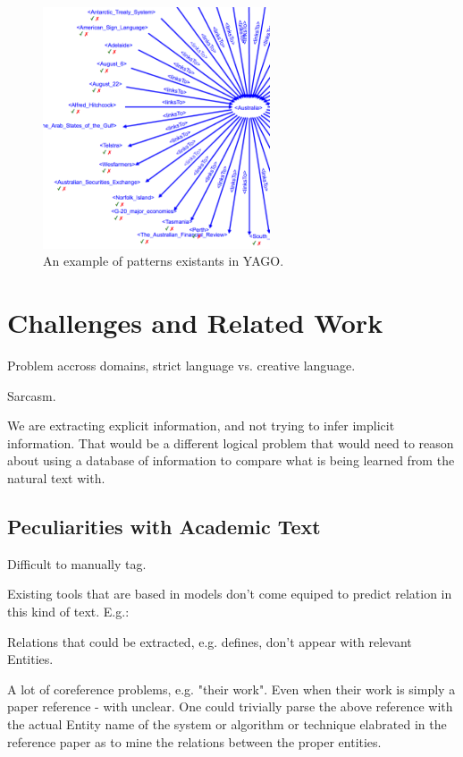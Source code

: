 \documentclass[11pt,a4paper,openright]{memoir}
\begin{document}
\begin{figure}[!htbp]
  \centering
    \includegraphics[width=0.6\textwidth]{./images/yago}
  \caption[An example of patterns existants in YAGO.]{An example of patterns existants in YAGO.}
  \label{fig:yago_examples}
\end{figure}


%
%
%
%


\chapter{Challenges and Related Work}

Problem accross domains, strict language vs. creative language.

Sarcasm.

We are extracting explicit information, and not trying to infer implicit information. That would be a different logical problem that would need to reason about using a database of information to compare what is being learned from the natural text with.


%
%
%
%


\section{Peculiarities with Academic Text}

Difficult to manually tag.

Existing tools that are based in models don't come equiped to predict relation in this kind of text. E.g.:

Relations that could be extracted, e.g. deﬁnes, don't appear with relevant Entities.

A lot of coreference problems, e.g. "their work". Even when their work is simply a paper reference - with unclear. One could trivially parse the above reference with the actual Entity name of the system or algorithm or technique elabrated in the reference paper as to mine the relations between the proper entities.
\end{document}
